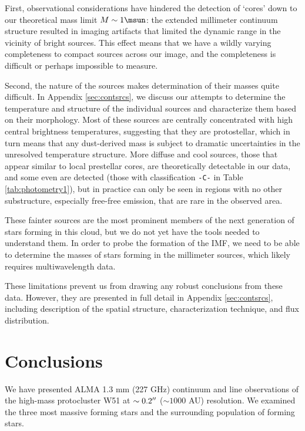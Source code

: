 \documentclass[twocolumn]{aastex61}
\begin{document}
First, observational considerations have hindered the detection of `cores' down
to our theoretical mass limit $M\sim1\msun$: the  extended millimeter continuum
structure resulted in imaging artifacts that limited the dynamic range in the
vicinity of bright sources.  This effect means that we have a wildly varying
completeness to compact sources across our image, and the completeness is
difficult or perhaps impossible to measure.

Second, the nature of the sources makes determination of their masses quite
difficult.  In Appendix \ref{sec:contsrcs}, we discuss our attempts to
determine the temperature and structure of the individual sources and
characterize them based on their morphology.  Most of these sources are
centrally concentrated with high central brightness temperatures, suggesting
that they are protostellar, which in turn means that any dust-derived mass is
subject to dramatic uncertainties in the unresolved temperature structure.
More diffuse and cool sources, those that appear similar to local prestellar
cores, are theoretically detectable in our data, and some even are detected
(those with classification \texttt{-C-} in Table \ref{tab:photometry1}), but in
practice can only be seen in regions with no other substructure, especially
free-free emission, that are rare in the observed area.

These fainter sources are the most prominent members of the next generation of
stars forming in this cloud, but we do not yet have the tools needed to
understand them.  In order to probe the formation of the IMF, we need to be
able to determine the masses of stars forming in the millimeter sources, which
likely requires multiwavelength data.  

These limitations prevent us from drawing any robust conclusions from these
data.  However, they are presented in full detail in Appendix
\ref{sec:contsrcs}, including description of the spatial structure,
characterization technique, and flux distribution.



\section{Conclusions}
\label{sec:conclusion}

We have presented ALMA 1.3 mm (227 GHz) continuum and line observations of the
high-mass protocluster W51 at $\sim0.2\mbox{$^{\prime\prime}$}$ ($\sim1000$ AU) resolution.  We
examined the three most massive forming stars and the surrounding population of
forming stars.  
\end{document}
